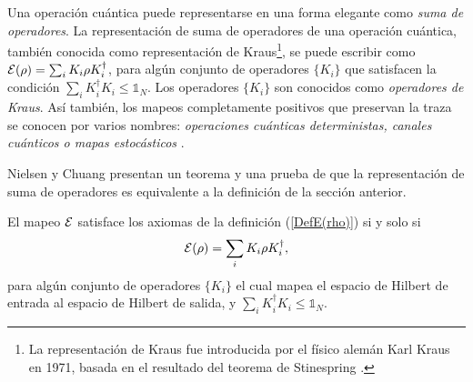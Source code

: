 %

Una operación cuántica puede representarse en una forma elegante 
como  \textit{suma de operadores}.   La representación de suma de operadores de
una operación cuántica,
también conocida como representación de Kraus\footnote{ La representación de
Kraus fue introducida por el físico alemán Karl Kraus en 1971, basada en el
resultado del teorema de Stinespring {\cite{2007geometry}}.}, se puede escribir
como $\mathcal{E}(\rho)=\sum_i K_i\rho K_i^\dagger$, para algún conjunto de operadores
$\{K_i\}$ que satisfacen la condición $\sum_i K_i^\dagger K_i\le \mathds{1}_N$.
Los operadores
$\{K_i\}$ son conocidos como \textit{operadores de Kraus}. Así también, los
mapeos completamente positivos que preservan la traza se conocen por varios
nombres: \textit{operaciones cuánticas deterministas, canales cuánticos o mapas
estocásticos}  {\cite{2007geometry}}.

Nielsen y Chuang {\cite{nielsen_chuang_2010}} presentan un teorema y una prueba de que la representación de suma de operadores es equivalente a la definición de la sección anterior.

\begin{theorem}\label{teorema:equivalencia_propiedadesaxiomaticas_opKraus}
    El mapeo $\mathcal{E}$ satisface los axiomas de la definición ({\ref{DefE(rho)}}) si y solo si 
    \begin{equation}
        \mathcal{E}(\rho)=\sum_i K_i \rho K_i^\dagger,
    \end{equation}
    para algún conjunto de operadores $\{K_i\}$ el cual mapea el espacio de Hilbert de entrada al espacio de Hilbert de salida, y $\sum_i K_i^\dagger K_i\le \mathds{1}_N$.
\end{theorem}


